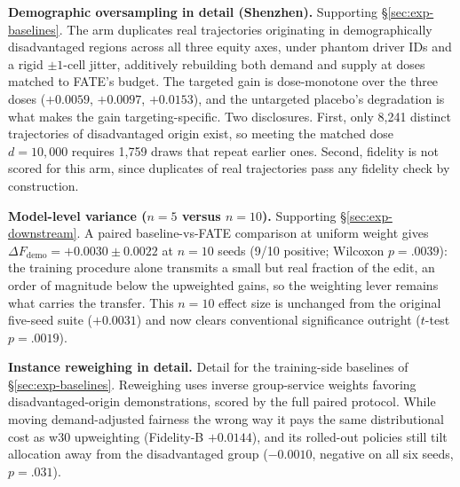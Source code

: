 \textbf{Demographic oversampling in detail (Shenzhen).} Supporting
\S\ref{sec:exp-baselines}. The arm duplicates real trajectories originating in
demographically disadvantaged regions
\cite{kamirancalders2012,zietlow2022} across all three equity axes, under
phantom driver IDs and a rigid $\pm 1$-cell jitter, additively rebuilding both
demand and supply at doses matched to FATE's budget. The targeted gain is
dose-monotone over the three doses ($+0.0059$, $+0.0097$, $+0.0153$), and the
untargeted placebo's degradation is what makes the gain targeting-specific.
Two disclosures. First, only 8{,}241 distinct trajectories of disadvantaged
origin exist, so meeting the matched dose $d = 10{,}000$ requires 1{,}759
draws that repeat earlier ones. Second, fidelity is not scored for this arm,
since duplicates of real trajectories pass any fidelity check by construction.

\textbf{Model-level variance ($n = 5$ versus $n = 10$).} Supporting
\S\ref{sec:exp-downstream}. A paired baseline-vs-FATE comparison at uniform
weight gives $\Delta F_{\mathrm{demo}} = +0.0030 \pm 0.0022$ at $n = 10$
seeds (9/10 positive; Wilcoxon $p = .0039$): the training procedure alone
transmits a small but real fraction of the edit, an order of magnitude below
the upweighted gains, so the weighting lever remains what carries the
transfer. This $n = 10$ effect size is unchanged from the original five-seed
suite ($+0.0031$) and now clears conventional significance outright
($t$-test $p = .0019$).

\textbf{Instance reweighing in detail.} Detail for the training-side
baselines of \S\ref{sec:exp-baselines}. Reweighing uses inverse group-service
weights favoring disadvantaged-origin demonstrations, scored by the full
paired protocol. While moving demand-adjusted fairness the wrong way it pays
the same distributional cost as w30 upweighting (Fidelity-B $+0.0144$), and %
its rolled-out policies still tilt allocation away from the disadvantaged
group ($-0.0010$, negative on all six seeds, $p = .031$).

